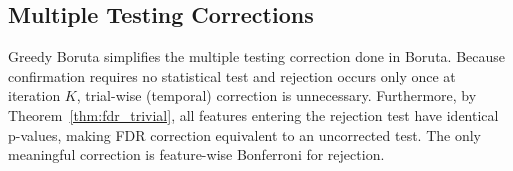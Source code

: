 \documentclass[runningheads]{llncs}
\begin{document}



\subsection{Multiple Testing Corrections}
\label{sec:method:corrections}

Greedy Boruta simplifies the multiple testing correction done in Boruta. Because confirmation requires no statistical test and rejection occurs only once at iteration $K$, trial-wise (temporal) correction is unnecessary. Furthermore, by Theorem~\ref{thm:fdr_trivial}, all features entering the rejection test have identical p-values, making FDR correction equivalent to an uncorrected test. The only meaningful correction is feature-wise Bonferroni for rejection.
\end{document}
